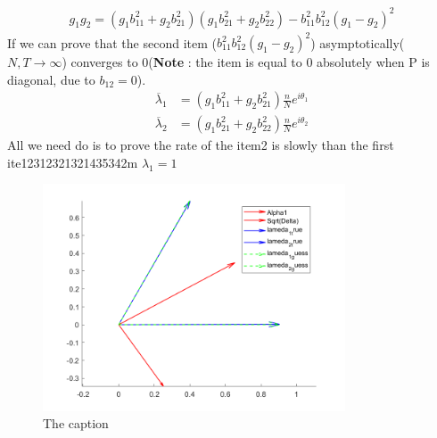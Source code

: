 \documentclass[11pt,a4paper]{article}
\begin{document}
\begin{align}
    \begin{equation}
        g_1g_2 = (g_1b_{11}^2 + g_2 b_{21}^2)(g_1b_{21}^2 + g_2 b_{22}^2) - b_{11}^2b_{12}^2(g_1-g_2)^2
    \end{equation}
\end{align}
If we can prove that the second item ($b_{11}^2b_{12}^2(g_1-g_2)^2$)  asymptotically($N,T \rightarrow \infty$) converges to 0(\textbf{Note} : the item is equal to 0 absolutely when P is diagonal,  due to $b_{12} = 0$).
\begin{equation}
    \begin{aligned}
        \overline{\lambda}_1 &= (g_1b_{11}^2 + g_2 b_{21}^2)\frac{n}{N} e^{i\theta_1}\\ \overline{\lambda}_2 &= (g_1b_{21}^2 + g_2 b_{22}^2)\frac{n}{N} e^{i\theta_2}
    \end{aligned}
\end{equation}
All we need do is to prove the rate of the item2 is slowly than the first ite12312321321435342m $\lambda_1 =1 $
\begin{figure}
    \centering
    \includegraphics[width=0.8\textwidth,height=0.5\textwidth]{12345.png}
    \caption{The caption} \label{fig1}
    \end{figure}
    
\end{document}
